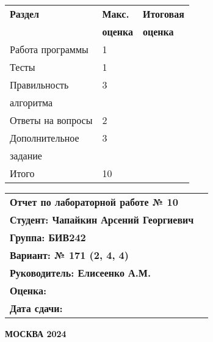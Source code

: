 \begin{titlepage}
    \begin{minipage}{0.35\textwidth}
        \begin{tabular}{|l|l|l|}
            \hline
            \textbf{Раздел} & \textbf{Макс.} & \textbf{Итоговая}\\
            & \textbf{оценка} & \textbf{оценка} \\[2ex]
            \hline
            Работа программы & 1 & \\[3ex]
            \hline
            Тесты & 1 & \\[3ex]
            \hline
            Правильность & 3 & \\
            алгоритма & & \\[3ex]
            \hline
            Ответы на вопросы & 2 & \\[3ex]
            \hline
            Дополнительное & 3 & \\
            задание & & \\[3ex]
            \hline
            Итого & 10 & \\[3ex]
            \hline
        \end{tabular}
    \end{minipage}%
    \hfill
    \begin{minipage}{0.45\textwidth}
        \begin{tabular}{lc}
            \textbf{Отчет по лабораторной работе № 10} & \\[2ex]
            \textbf{Студент: Чапайкин Арсений Георгиевич} &\\[2ex]
            \textbf{Группа: БИВ242} & \\[2ex]
            \textbf{Вариант: № 171 (2, 4, 4)} &\\[2ex]
            \textbf{Руководитель: Елисеенко А.М.} &\\[2ex]
            \textbf{Оценка:} &\\[2ex]
            \textbf{Дата сдачи:} &\\[2ex]
        \end{tabular}
    \end{minipage}%
    \vspace*{\fill}
    \begin{center}
        \textbf{МОСКВА 2024}
    \end{center}
\end{titlepage}
